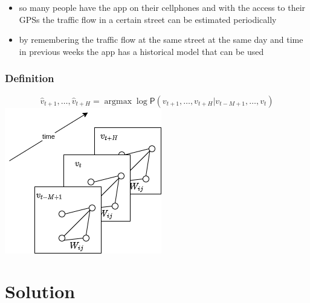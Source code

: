 \documentclass{beamer}
\begin{document}
\begin{frame}
  \begin{itemize}
      \item so many people have the app on their cellphones and with the access to their GPSs the traffic flow in a certain street can be estimated periodically
      \item by remembering the traffic flow at the same street at the same day and time in previous weeks the app has a historical model that can be used
  \end{itemize}
\end{frame}
\begin{frame}
  \frametitle{Definition}
  \begin{equation}
    \label{eq:base}
    \hat{v}_{t+1}, \ldots,  \hat{v}_{t+H} = \mathop{\mathrm{argmax}} \log \mathsf{P}({v}_{t+1}, \ldots,  v_{t+H} | v_{t-M+1} , \ldots,  v_{t})
  \end{equation}
  \centering
  \includegraphics[height=.5\textheight]{img/base.png}
\end{frame}

\section{Solution}
\end{document}
